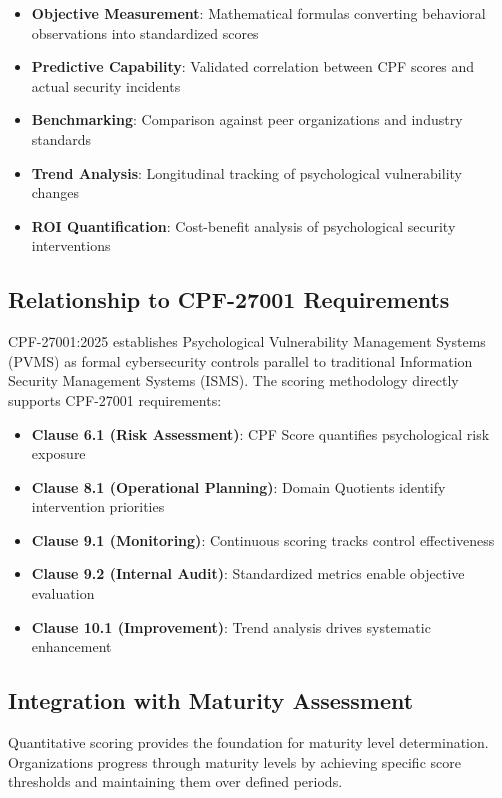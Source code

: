 \documentclass[11pt,a4paper]{article}
\begin{document}
\begin{itemize}
\item \textbf{Objective Measurement}: Mathematical formulas converting behavioral observations into standardized scores
\item \textbf{Predictive Capability}: Validated correlation between CPF scores and actual security incidents
\item \textbf{Benchmarking}: Comparison against peer organizations and industry standards
\item \textbf{Trend Analysis}: Longitudinal tracking of psychological vulnerability changes
\item \textbf{ROI Quantification}: Cost-benefit analysis of psychological security interventions
\end{itemize}

\subsection{Relationship to CPF-27001 Requirements}

CPF-27001:2025 establishes Psychological Vulnerability Management Systems (PVMS) as formal cybersecurity controls parallel to traditional Information Security Management Systems (ISMS). The scoring methodology directly supports CPF-27001 requirements:

\begin{itemize}
\item \textbf{Clause 6.1 (Risk Assessment)}: CPF Score quantifies psychological risk exposure
\item \textbf{Clause 8.1 (Operational Planning)}: Domain Quotients identify intervention priorities
\item \textbf{Clause 9.1 (Monitoring)}: Continuous scoring tracks control effectiveness
\item \textbf{Clause 9.2 (Internal Audit)}: Standardized metrics enable objective evaluation
\item \textbf{Clause 10.1 (Improvement)}: Trend analysis drives systematic enhancement
\end{itemize}

\subsection{Integration with Maturity Assessment}

Quantitative scoring provides the foundation for maturity level determination. Organizations progress through maturity levels by achieving specific score thresholds and maintaining them over defined periods.
\end{document}
